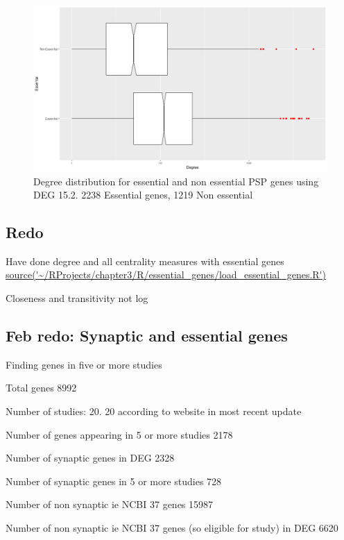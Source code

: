 \begin{figure}
    \centering
    \includegraphics[width=\textwidth]{images/Rplot_essential_non_essential_gene_degree.png}
    \caption{Degree distribution for essential and non essential PSP genes using DEG 15.2. 2238 Essential genes, 1219 Non essential}
    \label{fig:boxplot_log degree essential genes}
\end{figure}



\subsection{Redo}
Have done degree and all centrality measures with essential genes \url{source('~/RProjects/chapter3/R/essential_genes/load_essential_genes.R')}

Closeness and transitivity not log
\subsection{Feb redo: Synaptic and essential genes}

     Finding genes in five or more studies  
     
     Total genes 8992  
     
     Number of studies: 20.              20 according to website in most recent update  
     
     Number of genes appearing in 5 or more studies 2178  
     
     Number of synaptic genes in DEG 2328  
     
     Number of synaptic genes in 5 or more studies 728  
     
      Number of non synaptic ie NCBI 37 genes 15987
      
     Number of non synaptic ie NCBI 37 genes (so eligible for study)             in DEG 6620  
     
